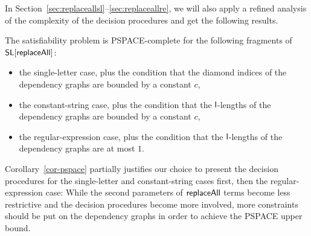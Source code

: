 In Section~\ref{sec:replaceallsl}--\ref{sec:replaceallre}, we will also apply a refined analysis of the complexity of the decision procedures and get the following results.

\begin{corollary}\label{cor-pspace}
The satisfiability problem is PSPACE-complete for the following fragments of $\mathsf{SL}[\mathsf{replaceAll}]$:
\begin{itemize}
\item the single-letter case, plus the condition that the diamond indices of the dependency graphs are bounded by a constant $c$, 
%
\item the constant-string case, plus the condition that the $\mathsf{l}$-lengths of the dependency graphs are bounded by a constant $c$, 

%
\item the regular-expression case, plus the condition that the $\mathsf{l}$-lengths of the dependency graphs are at most $1$.
\end{itemize}
\end{corollary}

Corollary~\ref{cor-pspace} partially justifies our choice to present the decision procedures for the single-letter and constant-string cases first, then the regular-expression case: While the second parameters of $\mathsf{replaceAll}$ terms become less restrictive and the decision procedures become more involved, more constraints should be put on the dependency graphs in order to achieve the PSPACE upper bound.




 


